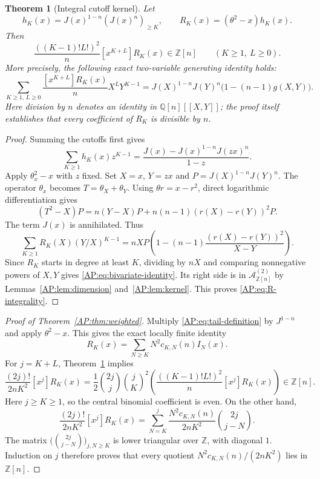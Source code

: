 \documentclass[11pt,a4paper]{article}
\newtheorem{theorem}{Theorem}[section]
\theoremstyle{definition}\newtheorem{definition}[theorem]{Definition}
\theoremstyle{remark}\newtheorem{remark}[theorem]{Remark}
\numberwithin{equation}{section}
\newcommand{\ZZ}{\mathbb Z}\newcommand{\QQ}{\mathbb Q}\newcommand{\tht}{\theta}
\begin{document}
\begin{theorem}[Integral cutoff kernel]\label{AP:thm:cutoff}
Let
\[
 h_K(x)=J(x)^{1-n}(J(x)^n)_{\geq K},\qquad
 R_K(x)=(\tht^2-x)h_K(x).
\]
Then
\begin{equation}\label{AP:eq:R-integrality}
 \frac{((K-1)!L!)^2}{n}[x^{K+L}]R_K(x)\in\ZZ[n]
 \qquad(K\geq1,\ L\geq0).
\end{equation}
More precisely, the following exact two-variable generating identity holds:
\begin{equation}\label{AP:eq:bivariate-identity}
 \boxed{\displaystyle
 \sum_{K\geq1,\,L\geq0}
   \frac{[x^{K+L}]R_K(x)}{n}X^LY^{K-1}
  =J(X)^{1-n}J(Y)^n\bigl(1-(n-1)g(X,Y)\bigr).}
\end{equation}
Here division by $n$ denotes an identity in $\QQ[n][[X,Y]]$; the proof
itself establishes that every coefficient of $R_K$ is divisible by $n$.
\end{theorem}
\begin{proof}
Summing the cutoffs first gives
\[
 \sum_{K\geq1}h_K(x)z^{K-1}
  =\frac{J(x)-J(x)^{1-n}J(zx)^n}{1-z}.
\]
Apply $\tht_x^2-x$ with $z$ fixed.  Set $X=x$, $Y=zx$ and
$P=J(X)^{1-n}J(Y)^n$.  The operator $\tht_x$ becomes
$T=\tht_X+\tht_Y$.  Using
$\tht r=x-r^2$, direct logarithmic differentiation gives
\[
 (T^2-X)P
  =n(Y-X)P+n(n-1)(r(X)-r(Y))^2P.
\]
The term $J(x)$ is annihilated.  Thus
\[
 \sum_{K\geq1}R_K(X)(Y/X)^{K-1}
  =nX P\left(1-(n-1)
             \frac{(r(X)-r(Y))^2}{X-Y}\right).
\]
Since $R_K$ starts in degree at least $K$, dividing by $nX$ and comparing
nonnegative powers of $X,Y$ gives \eqref{AP:eq:bivariate-identity}.
Its right side is in $\mathcal A^{(2)}_{\ZZ[n]}$ by
Lemmas~\ref{AP:lem:dimension} and~\ref{AP:lem:kernel}.  This proves
\eqref{AP:eq:R-integrality}.
\end{proof}

\begin{proof}[Proof of Theorem~\ref{AP:thm:weighted}]
Multiply \eqref{AP:eq:tail-definition} by $J^{1-n}$ and apply
$\tht^2-x$.  This gives the exact locally finite identity
\[
 R_K(x)=\sum_{N\geq K}N^2c_{K,N}(n)I_N(x).
\]
For $j=K+L$, Theorem~\ref{AP:thm:cutoff} implies
\[
 \frac{(2j)!}{2nK^2}[x^j]R_K(x)
 =\frac12\binom{2j}{j}\binom{j}{K}^{\!2}
   \left(\frac{((K-1)!L!)^2}{n}[x^j]R_K(x)\right)
 \in\ZZ[n].
\]
Here $j\geq K\geq1$, so the central binomial coefficient is even.
On the other hand,
\[
 \frac{(2j)!}{2nK^2}[x^j]R_K(x)
  =\sum_{N=K}^{j}
      \frac{N^2c_{K,N}(n)}{2nK^2}\binom{2j}{j-N}.
\]
The matrix $\bigl(\binom{2j}{j-N}\bigr)_{j,N\geq K}$ is lower triangular
over $\ZZ$, with diagonal $1$.  Induction on $j$ therefore proves that
every quotient $N^2c_{K,N}(n)/(2nK^2)$ lies in $\ZZ[n]$.
\end{proof}
\end{document}
